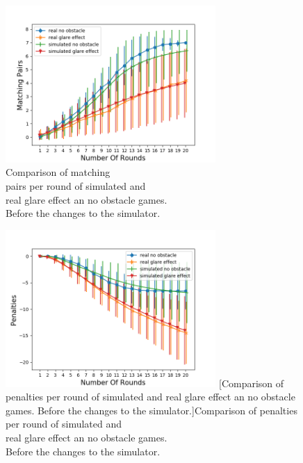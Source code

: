 \begin{minipage}{0.5\textwidth}
	\begin{figure}[H]
		\centering
		\includegraphics[width=8cm]{images/simulationInitial1.png}
		\caption[Comparison of matching pairs per round of simulated and real glare effect an no obstacle games. Before the changes to the simulator.]{Comparison of matching \\\hspace{0\textwidth}pairs per round of simulated and \\\hspace{0\textwidth}real glare effect an no obstacle games.\\\hspace{0\textwidth} Before the changes to the simulator.}
		\label{fig:simIn1}
	\end{figure}
\end{minipage}
\begin{minipage}{0.5\textwidth}
	\centering
	\begin{figure}[H]
		\centering
		\includegraphics[width=8cm]{images/simulationInitial2.png}
		[Comparison of penalties per round of simulated and real glare effect an no obstacle games. Before the changes to the simulator.]{Comparison of penalties\\\hspace{0\textwidth} per round of simulated and\\\hspace{0\textwidth} real glare effect an no obstacle games.\\\hspace{0\textwidth} Before the changes to the simulator.}
		\label{fig:simIn2}
	\end{figure}
\end{minipage}



